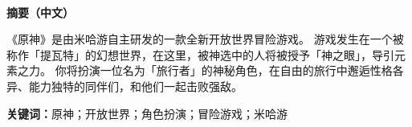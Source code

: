 \cleardoublepage

\begin{center}
    ~\\[-1.5em]
    \textbf{摘\quad 要（中文）}
\end{center}

\par 《原神》是由米哈游自主研发的一款全新开放世界冒险游戏。
游戏发生在一个被称作「提瓦特」的幻想世界，在这里，被神选中的人将被授予「神之眼」，导引元素之力。
你将扮演一位名为「旅行者」的神秘角色，在自由的旅行中邂逅性格各异、能力独特的同伴们，和他们一起击败强敌。

\bigskip

\noindent \textbf{关键词：}原神；开放世界；角色扮演；冒险游戏；米哈游
